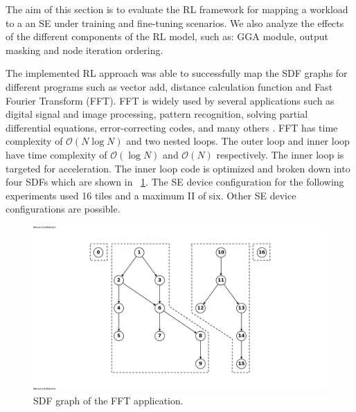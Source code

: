 
The aim of this section is to evaluate the RL framework for mapping a workload to a an SE under training and fine-tuning scenarios. 
We also analyze the effects of the different components of the RL model, such as: GGA module, output masking and node iteration ordering.

The implemented RL approach was able to successfully map the SDF graphs for different programs such as vector add, distance calculation function and Fast Fourier Transform (FFT). 
FFT is widely used by several applications such as digital signal and image processing, pattern recognition, solving partial differential equations, error-correcting codes, and many others \cite{814659}.
FFT has time complexity of $\mathcal{O}(N\log{N})$ and two nested loops.
The outer loop and inner loop have time complexity of $\mathcal{O}(\log{N})$ and $\mathcal{O}(N)$ respectively.
The inner loop is targeted for acceleration.
The inner loop code is optimized and broken down into four SDFs which are shown in \figurename~\ref{fig:ifft_graph}.
The SE device configuration for the following experiments used 16 tiles and a maximum II of six.
Other SE device configurations are possible.

\begin{figure}[tb]
  \centering
  \includegraphics[width=\linewidth]{fig/ifft_graph.pdf}
  \caption{SDF graph of the FFT application.}
  \label{fig:ifft_graph}
\end{figure}

